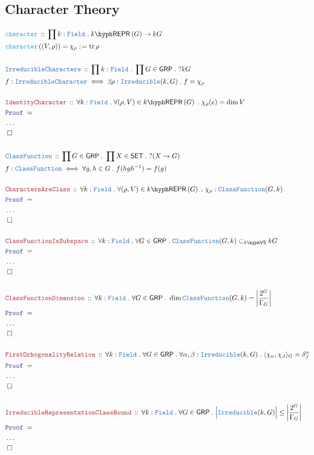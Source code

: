 \documentclass[12pt]{scrartcl}%
\newcommand{\TYPE}[1]{\textcolor{NavyBlue}{\mathtt{#1}}}%
\newcommand{\FUNC}[1]{\textcolor{Cerulean}{\mathtt{#1}}}%
\newcommand{\LOGIC}[1]{\textcolor{Blue}{\mathtt{#1}}}%
\newcommand{\THM}[1]{\textcolor{Maroon}{\mathtt{#1}}}%
\renewcommand{\.}{\; . \;} %
\newcommand{\de}{: \kern 0.1pc =} %
\newcommand{\Act}[1]{\left( #1 \right)} %
\newcommand{\Theorem}[2]{& \THM{#1} \, :: \, #2 \\ & \Proof = \\ } %
\newcommand{\DeclareType}[2]{& \TYPE{#1} \, :: \, #2 \\}%
\newcommand{\DefineType}[3]{& #1 : \TYPE{#2} \iff #3 \\}%
\newcommand{\DeclareFunc}[2]{& \FUNC{#1} \, :: \, #2 \\}%
\newcommand{\DefineNamedFunc}[4]{&  \FUNC{#1}\Act{#2} = #3 \de #4 \\}%
\newcommand{\Page}[1]{ \begin{align*} #1 \end{align*}  }%
\newcommand{\NoProof}{ & \ldots \\ \EndProof}%
\newcommand{\QED}{\; \square} %
\newcommand{\EndProof}{& \QED \\} %
\newcommand{\Proof}{\LOGIC{Proof} \; } %
\newcommand{\SET}{\mathsf{SET}} %
\newcommand{\GRP}{\mathsf{GRP}} %
\newcommand{\REPR}[2]{#1\hyph\mathsf{REPR}\left(#2\right)}
\newcommand{\subvec}[1]{\subset_{\VS{#1}}}%
\DeclareMathOperator{\tr}{tr}     %
\newcommand{\VS}[1]{#1\hyph\mathsf{VS}} %
\newcommand{\Field}{\TYPE{Field}}
\begin{document}
\subsection{Character Theory}
\Page{
	\DeclareFunc{character}
	{
		\prod k : \Field \. 
		\REPR{k}{G} \to kG
	}
	\DefineNamedFunc{character}{(V,\rho)}
	{\chi_\rho}{ \tr \rho  }
	\\
	\DeclareType{IrreducibleCharacters}
	{
		\prod k : \Field \.
		\prod G \in \GRP \.
		?kG
	}
	\DefineType{f}{IrreducibleCharacter}
	{
		\exists \rho : \TYPE{Irreducible}(k,G) \.
		f = \chi_\rho
	}
	\\
	\Theorem{IdentityCharacter}
	{
		\forall k : \Field \. 
		\forall (\rho,V) \in \REPR{k}{G} \.
		\chi_\rho(e) = \dim  V
	}
	\NoProof
	\\
	\DeclareType{ClassFunction}
	{
		\prod G \in \GRP \.
		\prod X \in \SET \.
		?(X \to G)
	}
	\DefineType{f}{ClassFunction}
	{
		\forall g,h \in G \. f(hgh^{-1}) = f(g)
	}
	\\
	\Theorem{CharactersAreClass}
	{
		\forall k : \Field \. 
		\forall (\rho,V) \in \REPR{k}{G} \.
		\chi_\rho : \TYPE{ClassFunction}(G,k)
	}
	\NoProof
	\\
	\Theorem{ClassFunctionIsSubspace}
	{
		\forall k : \Field \.
		\forall G \in \GRP \.
		\TYPE{ClassFunction}(G,k) \subvec{k} kG
	}
	\NoProof
	\\
	\Theorem{ClassFunctionDimension}
	{
		\forall k : \Field \.
		\forall G \in \GRP \.
		\dim \TYPE{ClassFunction}(G,k) =
		\left| \frac{2^G}{\Gamma_G} \right|
	}
	\NoProof
	\\
	\Theorem{FirstOrhogonalityRelation}
	{
		\forall k : \Field \.
		\forall G \in \GRP \.
		\forall \alpha,\beta : \TYPE{Irreducible}(k,G) \. 
		\langle \chi_\alpha, \chi_\beta \rangle_G = 
		\delta^\alpha_\beta
	}
	\NoProof
	\\
	\Theorem{IrreducibleRepresentationClassBound}
	{
		\forall k : \Field \.
		\forall G \in \GRP \.
		\Big| \TYPE{Irreducible}(k,G) \Big| \le 
		\left| \frac{2^G}{\Gamma_G} \right|
	}
	\NoProof
}
\end{document}
